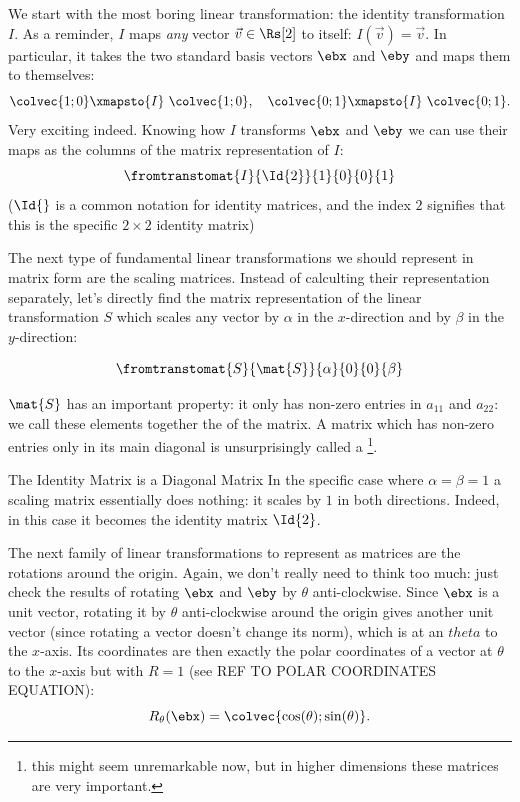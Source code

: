 We start with the most boring linear transformation: the identity transformation $I$. As a reminder, $I$ maps \textit{any} vector $\vec{v}\in\Rs[2]$ to itself: $I(\vec{v})=\vec{v}$. In particular, it takes the two standard basis vectors $\ebx$ and $\eby$ and maps them to themselves:
\begin{equation}
	\colvec{1;0} \xmapsto{I}\ \colvec{1;0},\quad \colvec{0;1} \xmapsto{I}\ \colvec{0;1}.
	\label{eq:}
\end{equation}
Very exciting indeed. Knowing how $I$ transforms $\ebx$ and $\eby$ we can use their maps as the columns of the matrix representation of $I$:
\begin{equation}
	\fromtranstomat{I}{\Id{2}}{1}{0}{0}{1}
	\label{eq:the 2-by-2 identity matrix}
\end{equation}
($\Id{}$ is a common notation for identity matrices, and the index $2$ signifies that this is the specific $2\times2$ identity matrix)

The next type of fundamental linear transformations we should represent in matrix form are the scaling matrices. Instead of calculting their representation separately, let's directly find the matrix representation of the linear transformation $S$ which scales any vector by $\alpha$ in the $x$-direction and by $\beta$ in the $y$-direction:

\begin{equation}
	\fromtranstomat{S}{\mat{S}}{\alpha}{0}{0}{\beta}
	\label{eq:matrix representation of scaling in R2}
\end{equation}

$\mat{S}$ has an important property: it only has non-zero entries in $a_{11}$ and $a_{22}$: we call these elements together the  of the matrix. A matrix which has non-zero entries only in its main diagonal is unsurprisingly called a \footnote{this might seem unremarkable now, but in higher dimensions these matrices are very important.}.

\begin{note}{The Identity Matrix is a Diagonal Matrix}{}
	In the specific case where $\alpha=\beta=1$ a scaling matrix essentially does nothing: it scales by $1$ in both directions. Indeed, in this case it becomes the identity matrix $\Id{2}$.
\end{note}

The next family of linear transformations to represent as matrices are the rotations around the origin. Again, we don't really need to think too much: just check the results of rotating $\ebx$ and $\eby$ by $\theta$ anti-clockwise. Since $\ebx$ is a unit vector, rotating it by $\theta$ anti-clockwise around the origin gives another unit vector (since rotating a vector doesn't change its norm), which is at an $theta$ to the $x$-axis. Its coordinates are then exactly the polar coordinates of a vector at $\theta$ to the $x$-axis but with $R=1$ (see REF TO POLAR COORDINATES EQUATION):
\begin{equation}
	R_{\theta}(\ebx) = \colvec{\cos(\theta);\sin(\theta)}.
	\label{eq:eb1 rotated by theta}
\end{equation}

